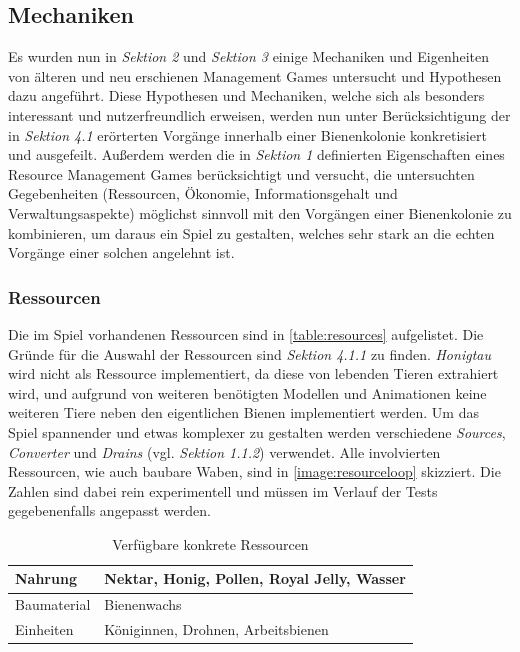 \subsection{Mechaniken}
Es wurden nun in \textit{Sektion 2} und \textit{Sektion 3} einige Mechaniken und Eigenheiten von älteren und neu erschienen Management Games untersucht und Hypothesen dazu angeführt. Diese Hypothesen und Mechaniken, welche sich als besonders interessant und nutzerfreundlich erweisen, werden nun unter Berücksichtigung der in \textit{Sektion 4.1} erörterten Vorgänge innerhalb einer Bienenkolonie konkretisiert und ausgefeilt. Außerdem werden die in \textit{Sektion 1} definierten Eigenschaften eines Resource Management Games berücksichtigt und versucht, die untersuchten Gegebenheiten (Ressourcen, Ökonomie, Informationsgehalt und Verwaltungsaspekte) möglichst sinnvoll mit den Vorgängen einer Bienenkolonie zu kombinieren, um daraus ein Spiel zu gestalten, welches sehr stark an die echten Vorgänge einer solchen angelehnt ist. 

\subsubsection{Ressourcen}
Die im Spiel vorhandenen Ressourcen sind in \autoref{table:resources} aufgelistet. Die Gründe für die Auswahl der Ressourcen sind \textit{Sektion 4.1.1} zu finden. \textit{Honigtau} wird nicht als Ressource implementiert, da diese von lebenden Tieren extrahiert wird, und aufgrund von weiteren benötigten Modellen und Animationen keine weiteren Tiere neben den eigentlichen Bienen implementiert werden. Um das Spiel spannender und etwas komplexer zu gestalten werden verschiedene \textit{Sources}, \textit{Converter} und \textit{Drains} (vgl. \textit{Sektion 1.1.2}) verwendet. Alle involvierten Ressourcen, wie auch baubare Waben, sind in \autoref{image:resourceloop} skizziert. Die Zahlen sind dabei rein experimentell und müssen im Verlauf der Tests gegebenenfalls angepasst werden.

\begin{table}[]
    \centering
    \caption{Verfügbare konkrete Ressourcen}
    \label{table:resources}
    \begin{tabular}{|l|l|}
    \hline
    Nahrung     & Nektar, Honig, Pollen, Royal Jelly, Wasser \\ \hline
    Baumaterial & Bienenwachs                                \\ \hline
    Einheiten   & Königinnen, Drohnen, Arbeitsbienen         \\ \hline
    \end{tabular}
\end{table}



